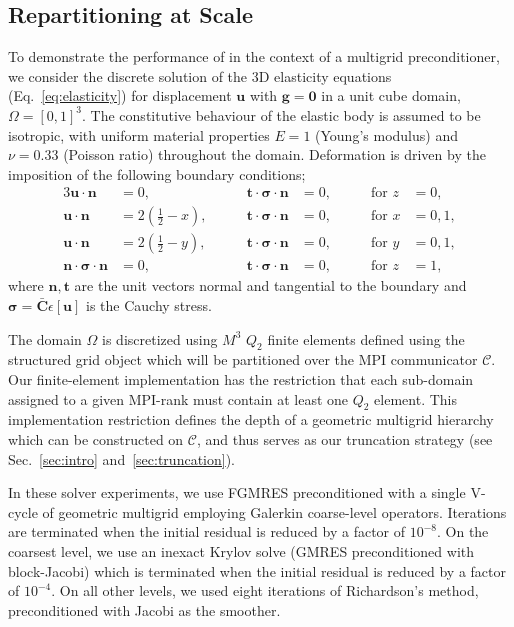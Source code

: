 \documentclass[]{siamart0216}
\newcommand{\cmat}[1]{\boldsymbol{#1}}
\newcommand{\cvec}[1]{\boldsymbol{#1}}
\begin{document}
\subsection{Repartitioning at Scale} \label{sec:partitioningatscale}
To demonstrate the performance of  in the context of a multigrid preconditioner, we 
consider the discrete solution of the 3D elasticity equations (Eq.~\eqref{eq:elasticity}) for displacement $\cvec u$ 
with $\cvec g = \cvec 0$ in a unit cube domain, $\Omega = [0,1]^3$. 
The constitutive behaviour of the elastic body is assumed to be isotropic, with uniform material properties 
$E= 1$ (Young's modulus) and $\nu = 0.33$ (Poisson ratio) throughout the domain.
Deformation is driven by the imposition of the following boundary conditions;
\begin{alignat*}{3}
\cvec u \cdot \cvec n &= 0,                              \qquad & \cvec t \cdot \cmat\sigma \cdot \cvec n &= 0,       \qquad & \text{for } z &= 0, \\
\cvec u \cdot \cvec n &= 2(\tfrac{1}{2} - x),       \qquad & \cvec t \cdot \cmat\sigma \cdot \cvec n &= 0,      \qquad & \text{for } x &= 0, 1, \\
\cvec u \cdot \cvec n &= 2(\tfrac{1}{2} - y),       \qquad & \cvec t \cdot \cmat\sigma \cdot \cvec n &= 0,      \qquad & \text{for } y &= 0, 1, \\
\cvec n \cdot \cmat \sigma \cdot \cvec n &= 0,  \qquad & \cvec t \cdot \cmat\sigma \cdot \cvec n &= 0,     \qquad & \text{for } z &= 1,
\end{alignat*}
where $\cvec n, \cvec t$ are the unit vectors normal and tangential to the boundary and $\cmat \sigma = \bar{\cmat C} \epsilon[\cvec u]$ is 
the Cauchy stress.

The domain $\Omega$ is discretized using $M^3$ $Q_2$ finite elements defined using the  structured grid object 
which will be partitioned over the MPI communicator $\mathcal C$. 
Our finite-element implementation has the restriction that each sub-domain assigned to a given MPI-rank must contain at 
least one $Q_2$ element. This implementation restriction defines the depth of a geometric multigrid hierarchy 
which can be constructed on $\mathcal C$, 
and thus serves as our truncation strategy (see Sec.~\ref{sec:intro} and~\ref{sec:truncation}).

In these solver experiments, we use FGMRES preconditioned with a single V-cycle of geometric multigrid 
employing Galerkin coarse-level operators. Iterations are terminated when the initial residual is reduced by a factor of $10^{-8}$.
On the coarsest level, we use an inexact Krylov solve (GMRES preconditioned with block-Jacobi) which is terminated when the initial residual  
is reduced by a factor of $10^{-4}$. On all other levels, we used eight iterations of Richardson's method, preconditioned  
with Jacobi as the smoother. 
\end{document}
